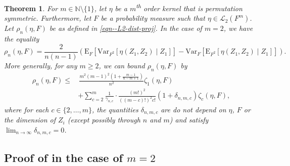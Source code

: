 \documentclass[12pt]{article}
\numberwithin{equation}{section}
\theoremstyle{definition}
\theoremstyle{plain}
\newtheorem{theorem}{Theorem}[section]
\begin{document}
\begin{theorem}
\label{thm--L2-dist-proj}
For \(m \in \mathbb{N} \setminus \{1\}\), let \(\eta\) be a
\(m\)\textsuperscript{th} order kernel that is permutation symmetric.
Furthermore, let \(F\) be a probability measure such that
\(\eta \in \mathscr{L}_{2} \left( F^{m} \right)\).
Let \(\rho_{n} (\eta, F)\) be as defined in \eqref{eqn--L2-dist-proj}.
In the case of \(m = 2\), we have the equality
\begin{equation}
  \rho_{n} (\eta, F) = \frac{2}{n (n - 1)} \left( \mathrm{E}_{F} \left[
  \mathrm{Var}_{F^{2}} \left[ \eta \left( Z_{1}, Z_{2} \right) \middle| Z_{1}
  \right] \right] - \mathrm{Var}_{F} \left[ \mathrm{E}_{F^{2}} \left[ \eta
  \left( Z_{1}, Z_{2} \right) \middle| Z_{1} \right] \right] \right).
  \label{eqn--L2-dist-proj-2}
\end{equation}
More generally, for any \(m \geq 2\), we can bound \(\rho_{n} (\eta, F)\)
by
\begin{equation}
  \begin{split}
  \rho_{n} (\eta, F) \leq
  & \, \frac{m^{2} (m - 1)^{2} \left( 1 + \frac{m - 1}{n - m + 1}
  \right)}{n^{2}} \zeta_{1} (\eta, F) \\
  & + \sum_{c = 2}^{m} \frac{1}{\gamma_{n, c}} \cdot \frac{(m !)^{2}}{((m -
c)!)^{2} c!}
  \left( 1 + \delta_{n, m, c} \right) \zeta_{c} (\eta, F),
  \end{split}
  \label{eqn--L2-dist-proj-m}
\end{equation}
where for each \(c \in \{2, \dots, m\}\), the quantities \(\delta_{n, m,
c}\) are do not depend on \(\eta\), \(F\) or the dimension of \(Z_{i}\) (except
possibly through \(n\) and \(m\)) and satisfy \(\lim_{n \to \infty} \delta_{n,
m, c}
= 0\).
\end{theorem}

\subsection{Proof of \texorpdfstring{}{Theorem
\ref{thm--L2-dist-proj}} in the case of \texorpdfstring{\(m = 2\)}{m = 2}}
\end{document}
